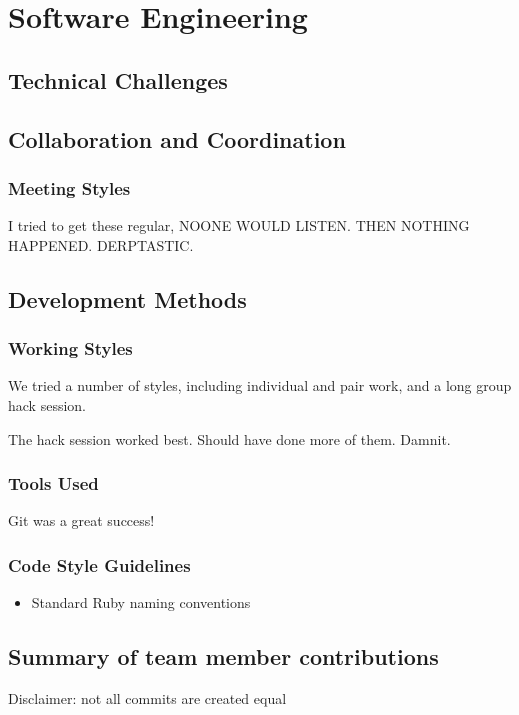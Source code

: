 \chapter{Software Engineering}
\section{Technical Challenges}
\section{Collaboration and Coordination}

\subsection{Meeting Styles}
I tried to get these regular, NOONE WOULD LISTEN.
THEN NOTHING HAPPENED.
DERPTASTIC.

\section{Development Methods}

\subsection{Working Styles}
We tried a number of styles, including individual and pair work, and a long group hack session.

The hack session worked best.
Should have done more of them.
Damnit.

\subsection{Tools Used}
Git was a great success!

\subsection{Code Style Guidelines}
\begin{itemize}
\item Standard Ruby naming conventions
\end{itemize}


\section{Summary of team member contributions}
Disclaimer: not all commits are created equal

